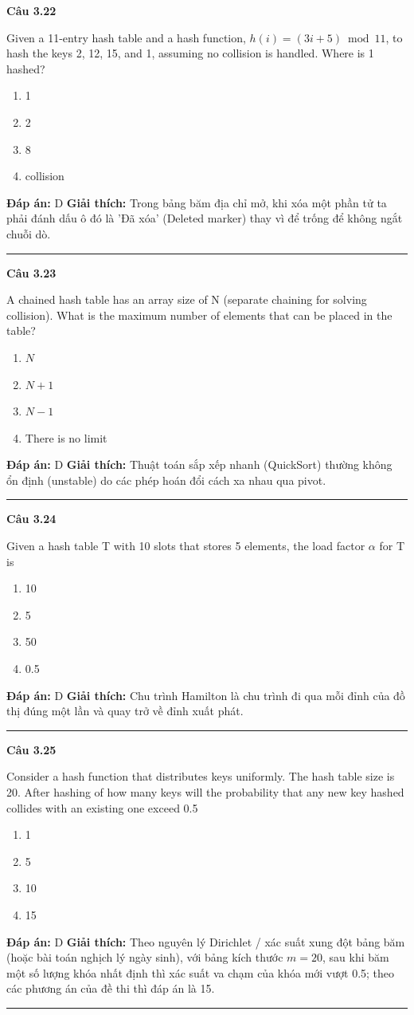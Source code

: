 \documentclass[11pt,a4paper]{article}
\newenvironment{question}[1]{%
  \par\vspace{1em}\noindent\textbf{\large Câu #1}\par\vspace{0.4em}
}{%
  \par\vspace{1em}\hrule\vspace{0.6em}
}
\newenvironment{choices}{%
  \begin{enumerate}[label=\textbf{\Alph*.},leftmargin=2.2em,itemsep=2pt,topsep=3pt]
}{%
  \end{enumerate}
}
\newcommand{\choice}{\item}
\begin{document}
\begin{question}{3.22}
Given a 11-entry hash table and a hash function, $h(i) = (3i + 5) \bmod 11$, to hash the keys 2, 12, 15, and 1, assuming no collision is handled. Where is 1 hashed?
\begin{choices}
\choice 1
\choice 2
\choice 8
\choice collision
\end{choices}
\textbf{Đáp án:} D
\textbf{Giải thích:} Trong bảng băm địa chỉ mở, khi xóa một phần tử ta phải đánh dấu ô đó là 'Đã xóa' (Deleted marker) thay vì để trống để không ngắt chuỗi dò.
\end{question}

\begin{question}{3.23}
A chained hash table has an array size of N (separate chaining for solving collision). What is the maximum number of elements that can be placed in the table?
\begin{choices}
\choice $N$
\choice $N + 1$
\choice $N - 1$
\choice There is no limit
\end{choices}
\textbf{Đáp án:} D
\textbf{Giải thích:} Thuật toán sắp xếp nhanh (QuickSort) thường không ổn định (unstable) do các phép hoán đổi cách xa nhau qua pivot.
\end{question}

\begin{question}{3.24}
Given a hash table T with 10 slots that stores 5 elements, the load factor $\alpha$ for T is
\begin{choices}
\choice 10
\choice 5
\choice 50
\choice 0.5
\end{choices}
\textbf{Đáp án:} D
\textbf{Giải thích:} Chu trình Hamilton là chu trình đi qua mỗi đỉnh của đồ thị đúng một lần và quay trở về đỉnh xuất phát.
\end{question}

\begin{question}{3.25}
Consider a hash function that distributes keys uniformly. The hash table size is 20. After hashing of how many keys will the probability that any new key hashed collides with an existing one exceed 0.5
\begin{choices}
\choice 1
\choice 5
\choice 10
\choice 15
\end{choices}
\textbf{Đáp án:} D
\textbf{Giải thích:} Theo nguyên lý Dirichlet / xác suất xung đột bảng băm (hoặc bài toán nghịch lý ngày sinh), với bảng kích thước $m = 20$, sau khi băm một số lượng khóa nhất định thì xác suất va chạm của khóa mới vượt 0.5; theo các phương án của đề thi thì đáp án là 15.
\end{question}
\end{document}
